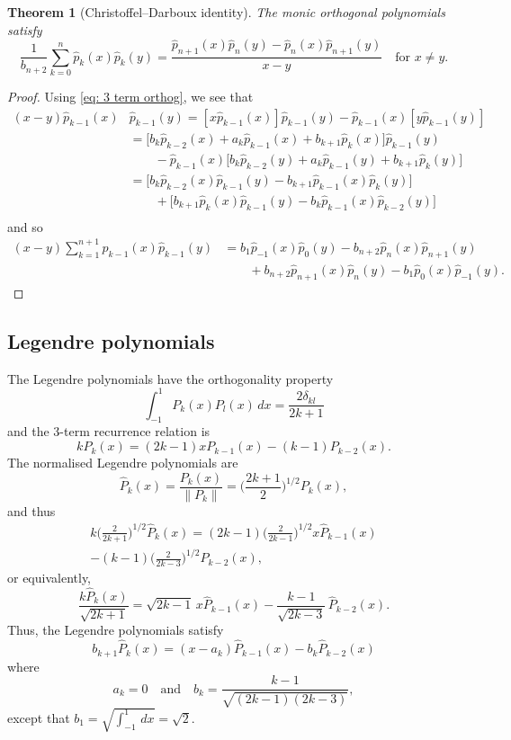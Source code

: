 \documentclass[12pt,a4paper]{article}
\newtheorem{theorem}{Theorem}
\begin{document}
\begin{theorem}[Christoffel--Darboux identity]
\label{thm: Christoffel-Darboux}
The monic orthogonal polynomials satisfy
\[
\frac{1}{b_{n+2}}\sum_{k=0}^n\hat p_k(x)\hat p_k(y)
	=\frac{\hat p_{n+1}(x)\hat p_n(y)-\hat p_n(x)\hat p_{n+1}(y)}{x-y}
	\quad\text{for $x\ne y$.}
\]
\end{theorem}
\begin{proof}
Using \eqref{eq: 3 term orthog}, we see that
\begin{align*}
(x-y)\hat p_{k-1}(x)&\hat p_{k-1}(y)
	=[x\hat p_{k-1}(x)]\hat p_{k-1}(y)
		-\hat p_{k-1}(x)[y\hat p_{k-1}(y)]\\
	&=\bigl[
	b_k\hat p_{k-2}(x)+a_k\hat p_{k-1}(x)+b_{k+1}\hat p_k(x)
	\bigr]\hat p_{k-1}(y)\\
	&\qquad{}-\hat p_{k-1}(x)\bigl[
	b_k\hat p_{k-2}(y)+a_k\hat p_{k-1}(y)+b_{k+1}\hat p_k(y)\bigr]\\
	&=\bigl[b_k\hat p_{k-2}(x)\hat p_{k-1}(y)
		-b_{k+1}\hat p_{k-1}(x)\hat p_k(y)\bigr]\\
	&\qquad{}+\bigl[b_{k+1}\hat p_k(x)\hat p_{k-1}(y)
		-b_k\hat p_{k-1}(x)\hat p_{k-2}(y)\bigr]\\
\end{align*}
and so
\begin{align*}
(x-y)\sum_{k=1}^{n+1}\hat p_{k-1}(x)\hat p_{k-1}(y)
	&=b_1\hat p_{-1}(x)\hat p_0(y)-b_{n+2}\hat p_n(x)\hat p_{n+1}(y)\\
	&\qquad{}+b_{n+2}\hat p_{n+1}(x)\hat p_n(y)
		-b_1\hat p_0(x)\hat p_{-1}(y).
\end{align*}
\end{proof}


\subsection{Legendre polynomials}
The Legendre polynomials have the orthogonality property
\begin{equation}\label{eq: legendre orthog}
\int_{-1}^1 P_k(x)P_l(x)\,dx=\frac{2\delta_{kl}}{2k+1}
\end{equation}
and the 3-term recurrence relation is
\begin{equation}\label{eq: legendre 3 term}
kP_k(x)=(2k-1)xP_{k-1}(x)-(k-1)P_{k-2}(x).
\end{equation}
The normalised Legendre polynomials are
\[
\hat P_k(x)=\frac{P_k(x)}{\|P_k\|}=\biggl(\frac{2k+1}{2}\biggr)^{1/2}
	P_k(x),
\]
and thus
\begin{multline*}
k\biggl(\frac{2}{2k+1}\biggr)^{1/2}\hat P_k(x)
	=(2k-1)\biggl(\frac{2}{2k-1}\biggr)^{1/2}x\hat P_{k-1}(x)\\
	-(k-1)\biggl(\frac{2}{2k-3}\biggr)^{1/2}\hat P_{k-2}(x),
\end{multline*}
or equivalently,
\[
\frac{k\hat P_k(x)}{\sqrt{2k+1}}=\sqrt{2k-1}\,x\hat P_{k-1}(x)
	-\frac{k-1}{\sqrt{2k-3}}\,\hat P_{k-2}(x).
\]
Thus, the Legendre polynomials satisfy
\[
b_{k+1}\hat P_k(x)=(x-a_k)\hat P_{k-1}(x)-b_k\hat P_{k-2}(x)
\]
where
\[
a_k=0\quad\text{and}\quad b_k=\frac{k-1}{\sqrt{(2k-1)(2k-3)}},
\]
except that $b_1=\sqrt{\int_{-1}^1\,dx}=\sqrt{2}$.
\end{document}

